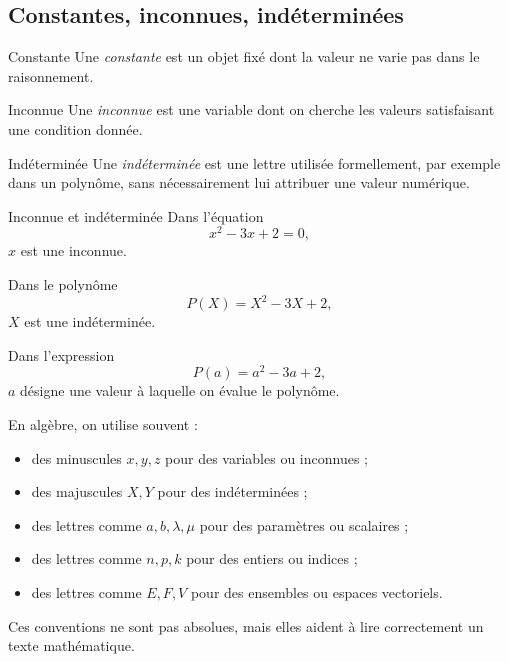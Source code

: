 \documentclass[11pt,a4paper]{article}
\begin{document}
\subsection{Constantes, inconnues, indéterminées}

\begin{definitionbox}{Constante}{}
Une \emph{constante} est un objet fixé dont la valeur ne varie pas dans le raisonnement.
\end{definitionbox}

\begin{definitionbox}{Inconnue}{}
Une \emph{inconnue} est une variable dont on cherche les valeurs satisfaisant une condition donnée.
\end{definitionbox}

\begin{definitionbox}{Indéterminée}{}
Une \emph{indéterminée} est une lettre utilisée formellement, par exemple dans un polynôme, sans nécessairement lui attribuer une valeur numérique.
\end{definitionbox}

\begin{exemplebox}{Inconnue et indéterminée}{}
Dans l'équation
\[
x^2-3x+2=0,
\]
$x$ est une inconnue.

Dans le polynôme
\[
P(X)=X^2-3X+2,
\]
$X$ est une indéterminée.

Dans l'expression
\[
P(a)=a^2-3a+2,
\]
$a$ désigne une valeur à laquelle on évalue le polynôme.
\end{exemplebox}

\begin{retenirbox}
En algèbre, on utilise souvent :
\begin{itemize}
    \item des minuscules $x,y,z$ pour des variables ou inconnues ;
    \item des majuscules $X,Y$ pour des indéterminées ;
    \item des lettres comme $a,b,\lambda,\mu$ pour des paramètres ou scalaires ;
    \item des lettres comme $n,p,k$ pour des entiers ou indices ;
    \item des lettres comme $E,F,V$ pour des ensembles ou espaces vectoriels.
\end{itemize}
Ces conventions ne sont pas absolues, mais elles aident à lire correctement un texte mathématique.
\end{retenirbox}
\end{document}
